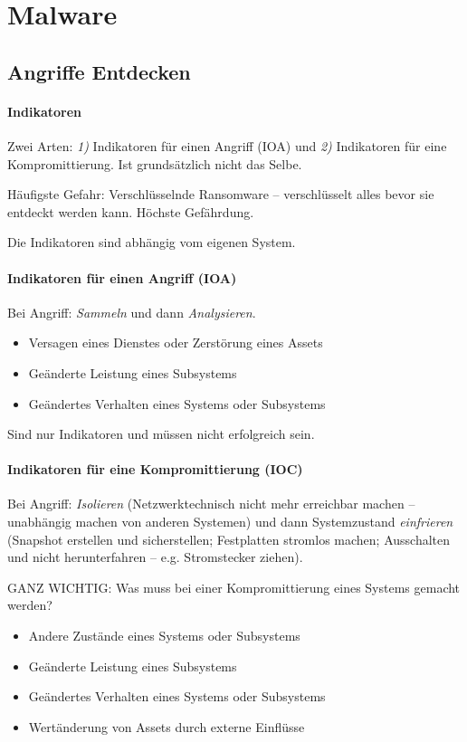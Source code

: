 \documentclass[a4paper,12pt]{article}
\begin{document}
\newpage
\section{Malware}

\subsection{Angriffe Entdecken}

\paragraph{Indikatoren} Zwei Arten: \emph{1)} Indikatoren für einen Angriff (IOA) und \emph{2)} Indikatoren für eine Kompromittierung.
Ist grundsätzlich nicht das Selbe.

Häufigste Gefahr: Verschlüsselnde Ransomware -- verschlüsselt alles bevor sie entdeckt werden kann. Höchste Gefährdung. 

Die Indikatoren sind abhängig vom eigenen System. 

\paragraph{Indikatoren für einen Angriff (IOA)}
Bei Angriff: \emph{Sammeln} und dann \emph{Analysieren}.

\begin{itemize}
\item Versagen eines Dienstes oder Zerstörung eines Assets
\item Geänderte Leistung eines Subsystems
\item Geändertes Verhalten eines Systems oder Subsystems
\end{itemize}

Sind nur Indikatoren und müssen nicht erfolgreich sein.

\paragraph{Indikatoren für eine Kompromittierung (IOC)}
Bei Angriff: \emph{Isolieren} (Netzwerktechnisch nicht mehr erreichbar machen -- unabhängig machen von anderen Systemen) und dann Systemzustand \emph{einfrieren} (Snapshot erstellen und sicherstellen; Festplatten stromlos machen; Ausschalten und nicht herunterfahren -- e.g. Stromstecker ziehen).

GANZ WICHTIG: Was muss bei einer Kompromittierung eines Systems gemacht werden?

\begin{itemize}
\item Andere Zustände eines Systems oder Subsystems
\item Geänderte Leistung eines Subsystems
\item Geändertes Verhalten eines Systems oder Subsystems
\item Wertänderung von Assets durch externe Einflüsse
\end{itemize}
\end{document}
